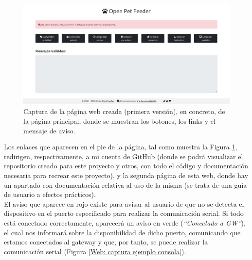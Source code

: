 \documentclass[12pt]{article}
\begin{document}
	\pagebreak
	
	\begin{figure}[h!]
		\begin{center}
			\includegraphics[width=1\textwidth]{img/captura_web_1.png}
			\caption{Captura de la página web creada (primera versión), en concreto, de la página principal, donde se muestran los botones, los links y el mensaje de aviso.}
			\label{Web: captura pagina principal}
		\end{center}
	\end{figure}
	
	\noindent Los enlaces que aparecen en el pie de la página, tal como muestra la Figura \ref{Web: captura pagina principal}, redirigen, respectivamente, a mi cuenta de GitHub (donde se podrá visualizar el repositorio creado para este proyecto y otros, con todo el código y documentación necesaria para recrear este proyecto), y la segunda página de esta web, donde hay un apartado con documentación relativa al uso de la misma (se trata de una guía de usuario a efectos prácticos). \\
	
	\noindent El aviso que aparece en rojo existe para avisar al usuario de que no se detecta el dispositivo en el puerto especificado para realizar la comunicación serial. Si todo está conectado correctamente, aparecerá un aviso en verde (\textit{``Conectado a GW''}), el cual nos informará sobre la disponibilidad de dicho puerto, comunicando que estamos conectados al gateway y que, por tanto, se puede realizar la comunicación serial (Figura \ref{Web: captura ejemplo consola}). \\
	
	\pagebreak
	
	
\end{document}
